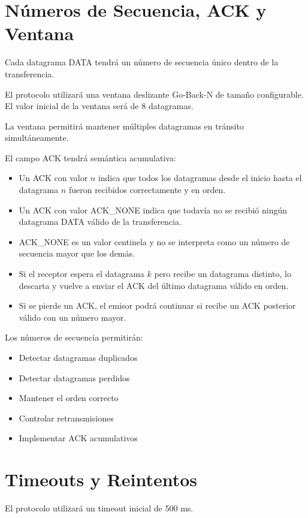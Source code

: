 \documentclass[12pt]{article}
\begin{document}
\section{Números de Secuencia, ACK y Ventana}

Cada datagrama DATA tendrá un número de secuencia único dentro de la transferencia.

El protocolo utilizará una ventana deslizante Go-Back-N de tamaño configurable. El valor inicial de la ventana será de 8 datagramas.

La ventana permitirá mantener múltiples datagramas en tránsito simultáneamente.

El campo ACK tendrá semántica acumulativa:

\begin{itemize}
\item Un ACK con valor $n$ indica que todos los datagramas desde el inicio hasta el datagrama $n$ fueron recibidos correctamente y en orden.
\item Un ACK con valor ACK\_NONE indica que todavía no se recibió ningún datagrama DATA válido de la transferencia.
\item ACK\_NONE es un valor centinela y no se interpreta como un número de secuencia mayor que los demás.
\item Si el receptor espera el datagrama $k$ pero recibe un datagrama distinto, lo descarta y vuelve a enviar el ACK del último datagrama válido en orden.
\item Si se pierde un ACK, el emisor podrá continuar si recibe un ACK posterior válido con un número mayor.
\end{itemize}

Los números de secuencia permitirán:

\begin{itemize}
\item Detectar datagramas duplicados
\item Detectar datagramas perdidos
\item Mantener el orden correcto
\item Controlar retransmisiones
\item Implementar ACK acumulativos
\end{itemize}

\section{Timeouts y Reintentos}

El protocolo utilizará un timeout inicial de 500 ms.
\end{document}
